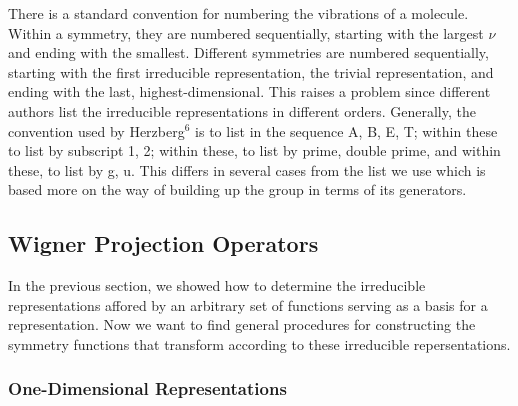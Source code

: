 There is a standard convention for numbering the vibrations of a 
molecule.  Within a symmetry, they are numbered sequentially, starting 
with the largest $\nu$ and ending with the smallest.  Different 
symmetries are numbered sequentially, starting with the first 
irreducible representation, the trivial representation, and ending 
with the last, highest-dimensional.  This raises a problem since 
different authors list the irreducible representations in different 
orders. Generally, the convention used by Herzberg$^6$ is to list in 
the sequence A, B, E, T; within these to list by subscript 1, 2; 
within these, to list by prime, double prime, and within these, to 
list by g, u.  This differs in several cases from the list we use 
which is based more on the way of building up the group in terms of 
its generators.

\subsection{Wigner Projection Operators}

In the previous section, we showed how to determine the irreducible 
representations affored by an arbitrary set of functions serving as a 
basis for a representation.  Now we want to find general procedures 
for constructing the symmetry functions that transform according to 
these irreducible repersentations.

\subsubsection{One-Dimensional Representations}

